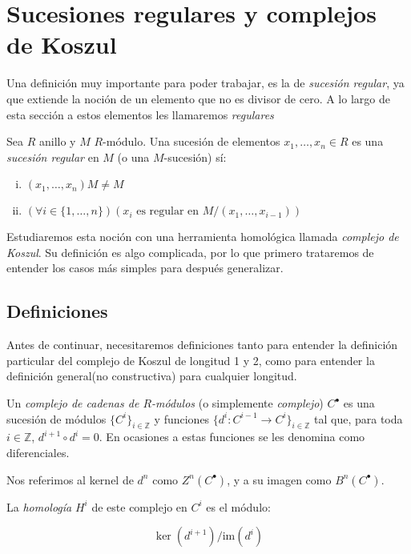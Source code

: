 \section{Sucesiones regulares y complejos de Koszul}

Una definición muy importante para poder trabajar, es la de \emph{sucesión regular}, ya que extiende la noción de un elemento que no es divisor de cero. A lo largo de esta sección a estos elementos les llamaremos \emph{regulares}

\begin{definition}

Sea $R$ anillo y $M$ $R$-módulo. Una sucesión de elementos $x_1,\dots,x_n \in R$ es una \emph{sucesión regular} en $M$ (o una $M$-sucesión) sí:

\begin{enumerate}[i)]
\item $(x_1,\dots,x_n)M \neq M$
\item $(\forall i \in \{1,\dots, n\})(x_i \textrm{ es regular en } M/(x_1,\dots, x_{i-1}))$
\end{enumerate}

\end{definition}

Estudiaremos esta noción con una herramienta homológica llamada \emph{complejo de Koszul}. Su definición es algo complicada, por lo que primero trataremos de entender los casos más simples para después generalizar.

\subsection{Definiciones}

Antes de continuar, necesitaremos definiciones tanto para entender la definición particular del complejo de Koszul de longitud 1 y 2, como para entender la definición general(no constructiva) para cualquier longitud.

\begin{definition}

Un \emph{complejo de cadenas de $R$-módulos} (o simplemente \emph{complejo}) $C^{\bullet}$ es una sucesión de módulos $\{C^i\}_{i \in \mathbb{Z}}$ y funciones $\{d^i: C^{i-1}\rightarrow C^i\}_{i \in \mathbb{Z}}$ tal que, para toda $i \in \mathbb{Z}$, $d^{i+1} \circ d^i = 0$. En ocasiones a estas funciones se les denomina como diferenciales.

Nos referimos al kernel de $d^n$ como $Z^n(C^\bullet)$, y a su imagen como $B^n(C^\bullet)$.

La \emph{homología} $H^i$ de este complejo en $C^i$ es el módulo:

$$ \ker(d^{i+1})/\textrm{im}(d^{i})$$

\end{definition}


